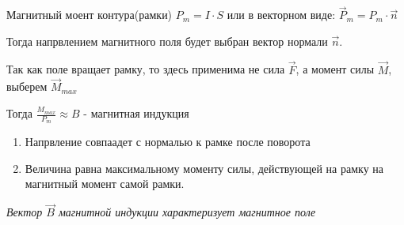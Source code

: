 \documentclass[../main.tex]{subfiles}
\begin{document}
 Магнитный моент контура(рамки) $P_m = I \cdot S$ или в векторном виде: $\vec P_m = P_m \cdot \vec n$

Тогда напрвлением магнитного поля будет выбран вектор нормали $\vec n$.


Так как поле вращает рамку, то здесь применима не сила $\vec F$, а момент силы $\vec M$, выберем $\vec M_{max}$

Тогда $\frac{M_{max}}{P_m} \approx B$ - магнитная индукция

\begin{enumerate}
    \item Напрвление совпаадет с нормалью к рамке после поворота
    \item Величина равна максимальному моменту силы, действующей на рамку на магнитный момент самой рамки. 
\end{enumerate}

\textit{Вектор $\vec B$ магнитной индукции характеризует магнитное поле}
\end{document}
